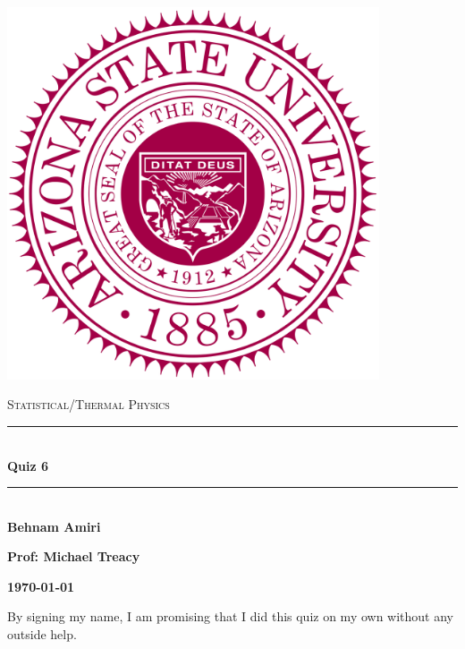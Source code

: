 \documentclass[fleqn]{article}
\begin{document}
  \begin{titlepage}

    \newcommand{\HRule}{\rule{\linewidth}{0.5mm}}

    \center

    \begin{center}
      \includegraphics[height=11cm, width=11cm]{asu.png}
    \end{center}

    \vline

    \textsc{\LARGE Statistical/Thermal Physics}\\[1.5cm]

    \HRule \\[0.5cm]
    { \huge \bfseries Quiz 6}\\[0.4cm] 
    \HRule \\[1.0cm]

    \textbf{Behnam Amiri}

    \bigbreak

    \textbf{Prof: Michael Treacy}

    \bigbreak

    \textbf{{\large \today}\\[2cm]}

    \vfill

  \end{titlepage}

  By signing my name, I am promising that I did this quiz on my own without any outside help.

  \vspace{0.5cm}
\end{document}
